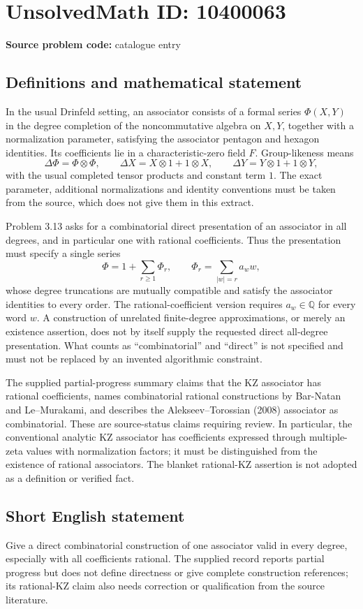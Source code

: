 \documentclass[11pt]{article}
\newcommand{\Q}{\mathbb{Q}}
\begin{document}
\section*{UnsolvedMath ID: 10400063}
\textbf{Source problem code:} catalogue entry
\subsection{Definitions and mathematical statement}
In the usual Drinfeld setting, an associator consists of a formal series \(\Phi(X,Y)\) in the degree completion of the noncommutative algebra on \(X,Y\), together with a normalization parameter, satisfying the associator pentagon and hexagon identities. Its coefficients lie in a characteristic-zero field \(F\). Group-likeness means
\[
 \Delta\Phi=\Phi\otimes\Phi,\qquad
 \Delta X=X\otimes1+1\otimes X,\qquad
 \Delta Y=Y\otimes1+1\otimes Y,
\]
with the usual completed tensor products and constant term \(1\). The exact parameter, additional normalizations and identity conventions must be taken from the source, which does not give them in this extract.

Problem 3.13 asks for a combinatorial direct presentation of an associator in all degrees, and in particular one with rational coefficients. Thus the presentation must specify a single series
\[
 \Phi=1+\sum_{r\ge1}\Phi_r,\qquad
 \Phi_r=\sum_{|w|=r}a_w w,
\]
whose degree truncations are mutually compatible and satisfy the associator identities to every order. The rational-coefficient version requires \(a_w\in\Q\) for every word \(w\). A construction of unrelated finite-degree approximations, or merely an existence assertion, does not by itself supply the requested direct all-degree presentation. What counts as ``combinatorial'' and ``direct'' is not specified and must not be replaced by an invented algorithmic constraint.

The supplied partial-progress summary claims that the KZ associator has rational coefficients, names combinatorial rational constructions by Bar-Natan and Le--Murakami, and describes the Alekseev--Torossian (2008) associator as combinatorial. These are source-status claims requiring review. In particular, the conventional analytic KZ associator has coefficients expressed through multiple-zeta values with normalization factors; it must be distinguished from the existence of rational associators. The blanket rational-KZ assertion is not adopted as a definition or verified fact.
\subsection{Short English statement}
Give a direct combinatorial construction of one associator valid in every degree, especially with all coefficients rational. The supplied record reports partial progress but does not define directness or give complete construction references; its rational-KZ claim also needs correction or qualification from the source literature.
\end{document}
